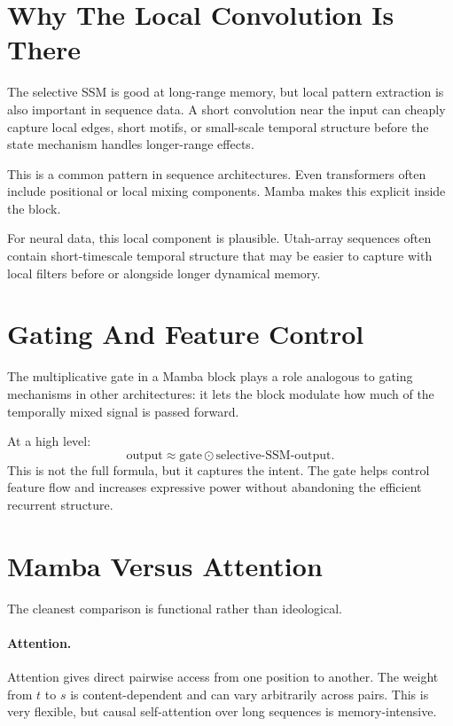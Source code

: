 \section{Why The Local Convolution Is There}

The selective SSM is good at long-range memory, but local pattern extraction is also
important in sequence data. A short convolution near the input can cheaply capture local
edges, short motifs, or small-scale temporal structure before the state mechanism handles
longer-range effects.

This is a common pattern in sequence architectures. Even transformers often include
positional or local mixing components. Mamba makes this explicit inside the block.

For neural data, this local component is plausible. Utah-array sequences often contain
short-timescale temporal structure that may be easier to capture with local filters before
or alongside longer dynamical memory.

\section{Gating And Feature Control}

The multiplicative gate in a Mamba block plays a role analogous to gating mechanisms in
other architectures: it lets the block modulate how much of the temporally mixed signal is
passed forward.

At a high level:
\[
  \text{output} \approx \text{gate} \odot \text{selective-SSM-output}.
\]
This is not the full formula, but it captures the intent. The gate helps control feature
flow and increases expressive power without abandoning the efficient recurrent structure.

\section{Mamba Versus Attention}

The cleanest comparison is functional rather than ideological.

\paragraph{Attention.}
Attention gives direct pairwise access from one position to another. The weight from $t$ to
$s$ is content-dependent and can vary arbitrarily across pairs. This is very flexible, but
causal self-attention over long sequences is memory-intensive.

